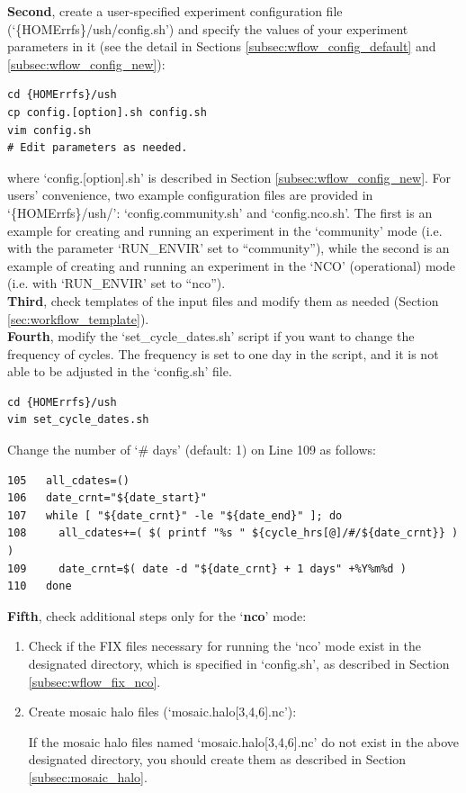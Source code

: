 \documentclass[11pt,fleqn]{report}              %
\begin{document}
{\bf Second}, create a user-specified experiment configuration file (`\{HOMErrfs\}/ush/config.sh') and specify the values of your experiment parameters in it (see the detail in Sections \ref{subsec:wflow_config_default} and \ref{subsec:wflow_config_new}):
\lstset{language=bash}   
\begin{lstlisting}[frame=trBL]
cd {HOMErrfs}/ush
cp config.[option].sh config.sh
vim config.sh
# Edit parameters as needed.
\end{lstlisting}
where `config.[option].sh' is described in Section \ref{subsec:wflow_config_new}. For users’ convenience, two example configuration files are provided in `\{HOMErrfs\}/ush/': `config.community.sh' and `config.nco.sh'. The first is an example for creating and running an experiment in the `community' mode (i.e. with the parameter `RUN\_ENVIR' set to ``community''), while the second is an example of creating and running an experiment in the `NCO' (operational) mode (i.e. with `RUN\_ENVIR' set to ``nco''). \\

{\bf Third}, check templates of the input files and modify them as needed (Section \ref{sec:workflow_template}). \\

{\bf Fourth}, modify the `set\_cycle\_dates.sh' script if you want to change the frequency of cycles. The frequency is set to one day in the script, and it is not able to be adjusted in the `config.sh' file.
\lstset{language=bash}   
\begin{lstlisting}[frame=trBL]
cd {HOMErrfs}/ush
vim set_cycle_dates.sh
\end{lstlisting}
 
Change the number of `\# days' (default: 1) on Line 109 as follows:
\lstset{language=bash}   
\begin{lstlisting}[frame=trBL, basicstyle=\scriptsize]
105   all_cdates=()
106   date_crnt="${date_start}"
107   while [ "${date_crnt}" -le "${date_end}" ]; do
108     all_cdates+=( $( printf "%s " ${cycle_hrs[@]/#/${date_crnt}} ) )
109     date_crnt=$( date -d "${date_crnt} + 1 days" +%Y%m%d )
110   done
\end{lstlisting}
  
 
 \vspace{0.5cm}

{\bf Fifth}, check additional steps only for the `{\bf nco}' mode:

\begin{enumerate}
\item Check if the FIX files necessary for running the `nco' mode exist in the designated directory, which is specified in `config.sh', as described in Section \ref{subsec:wflow_fix_nco}.

\item Create mosaic halo files (`mosaic.halo[3,4,6].nc'):

If the mosaic halo files named `mosaic.halo[3,4,6].nc' do not exist in the above designated directory, you should create them as described in Section \ref{subsec:mosaic_halo}.

\end{enumerate}
\end{document}

